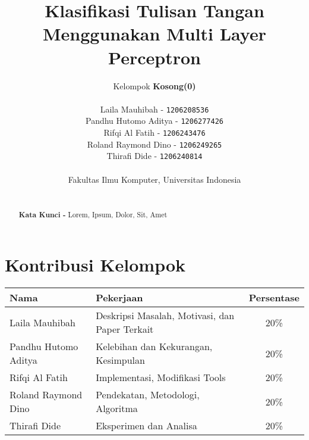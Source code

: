 \documentclass{article}
\begin{document}
\title{Klasifikasi Tulisan Tangan Menggunakan Multi Layer Perceptron}
\author{
	Kelompok \textbf{Kosong(0)} \\
	~\\
	Laila Mauhibah - \texttt{1206208536} \\
	Pandhu Hutomo Aditya - \texttt{1206277426} \\
	Rifqi Al Fatih - \texttt{1206243476} \\
	Roland Raymond Dino - \texttt{1206249265} \\
	Thirafi Dide - \texttt{1206240814} \\
	~\\
	Fakultas Ilmu Komputer, Universitas Indonesia
}

\maketitle

\begin{abstract}
\lipsum[1]
~\\
\noindent \textbf{Kata Kunci - }Lorem, Ipsum, Dolor, Sit, Amet
\end{abstract}

\pagebreak

\section*{Kontribusi Kelompok}
\begin{center}
  \begin{tabular}{ | l | l | c | }
  	\hline
  	Nama 					& Pekerjaan 										& Persentase \\
    \hline
    Laila Mauhibah 			& Deskripsi Masalah, Motivasi, dan Paper Terkait 	& 20\% \\ 
    Pandhu Hutomo Aditya 	& Kelebihan dan Kekurangan, Kesimpulan 				& 20\% \\ 
    Rifqi Al Fatih 			& Implementasi, Modifikasi Tools 					& 20\% \\
    Roland Raymond Dino 	& Pendekatan, Metodologi, Algoritma 				& 20\% \\
	Thirafi Dide 			& Eksperimen dan Analisa 							& 20\% \\
    \hline
  \end{tabular}
\end{center}

\pagebreak

\tableofcontents

\pagebreak
\end{document}
